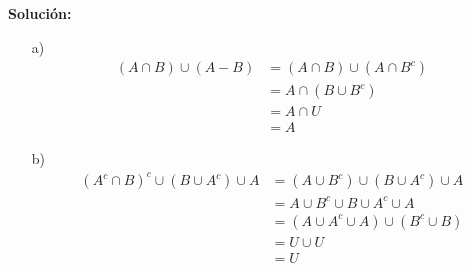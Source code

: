 \documentclass[a4paper,10pt]{article}
\begin{document}
\textbf{Solución:}
        \begin{enumerate}
            \item[a)]
                \begin{align*}
                          (A \cap B)\cup(A-B) &= (A \cap B)\cup(A\cap B^c) \\
                                              &= A \cap (B \cup B^c) \\
                                              &= A \cap U \\
                                              &= A
                \end{align*}

            \item[b)]
                \begin{align*}
                          (A^c \cap B)^c \cup (B \cup A^c) \cup A &= (A \cup B^c) \cup (B \cup A^c) \cup A  \\
                                                                  &= A \cup B^c \cup B \cup A^c \cup A  \\
                                                                  &= (A \cup A^c \cup A) \cup (B^c \cup B)  \\
                                                                  &= U \cup U  \\
                                                                  &= U
                \end{align*}


\end{enumerate}
\end{document}

